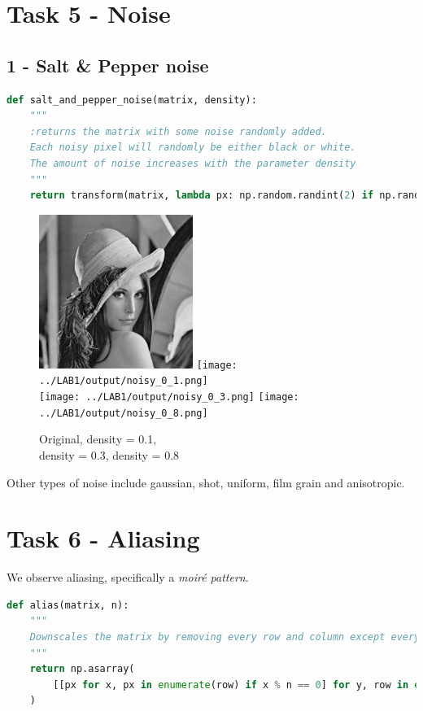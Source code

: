 \clearpage
\section*{Task 5 - Noise}

\subsection*{1 - Salt \& Pepper noise}

\begin{lstlisting}[language=Python, label=salt-and-pepper, caption=Salt \& pepper noise]
def salt_and_pepper_noise(matrix, density):
    """
    :returns the matrix with some noise randomly added.
    Each noisy pixel will randomly be either black or white.
    The amount of noise increases with the parameter density
    """
    return transform(matrix, lambda px: np.random.randint(2) if np.random.random() < density else px)
\end{lstlisting}


\begin{figure}[h!]
    \centering
    \includegraphics[width=5cm]{../LAB1/img/lena.png}
    \texttt{[image: ../LAB1/output/noisy\_0\_1.png]} \\
    \texttt{[image: ../LAB1/output/noisy\_0\_3.png]}
    \texttt{[image: ../LAB1/output/noisy\_0\_8.png]}
    \caption{Original, density = 0.1,\\ density = 0.3, density = 0.8}
\end{figure}

Other types of noise include gaussian, shot, uniform, film grain and anisotropic.



\clearpage
\section*{Task 6 - Aliasing}

We observe aliasing, specifically a \textit{moiré pattern}.

\begin{lstlisting}[language=Python, label=aliasing, caption=Aliasing function]
def alias(matrix, n):
    """
    Downscales the matrix by removing every row and column except every nth.
    """
    return np.asarray(
        [[px for x, px in enumerate(row) if x % n == 0] for y, row in enumerate(matrix) if y % n == 0]
    )
\end{lstlisting}

